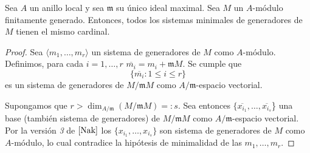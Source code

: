 \documentclass[../main.tex]{subfiles}
\begin{document}
\begin{corollary}
	Sea $A$ un anillo local y sea $\mathfrak{m}$ su único ideal maximal. Sea $M$ un $A$-módulo finitamente generado. Entonces, todos los sistemas minimales de generadores de $M$ tienen el mismo cardinal.
\end{corollary}
\begin{proof}
	Sea $\langle m_1,\dots,m_r\rangle$ un sistema de generadores de $M$ como $A$-módulo. Definimos, para cada $i=1,\dots,r$ $\overline{m_i}=m_i+\mathfrak{m}M$. Se cumple que $$\{\overline{m_i}:1\le i\le r\}$$ es un sistema de generadores de $M/\mathfrak{m}M$ como $A/\mathfrak{m}$-espacio vectorial.

	Supongamos que $r>\dim_{A/\mathfrak{m}}(M/\mathfrak{m}M)=:s$. Sea entonces $\{\overline{x_{i_1}},\dots,\overline{x_{i_s}}$\} una base (también sistema de generadores) de $M/\mathfrak{m}M$ como $A/\mathfrak{m}$-espacio vectorial. Por la versión \textit{3} de $\ref{Nak}$ los $\{x_{i_1},\dots,x_{i_s}\}$ son sistema de generadores de $M$ como $A$-módulo, lo cual contradice la hipótesis de minimalidad de las $m_1,\dots,m_r$.
\end{proof}
\end{document}
